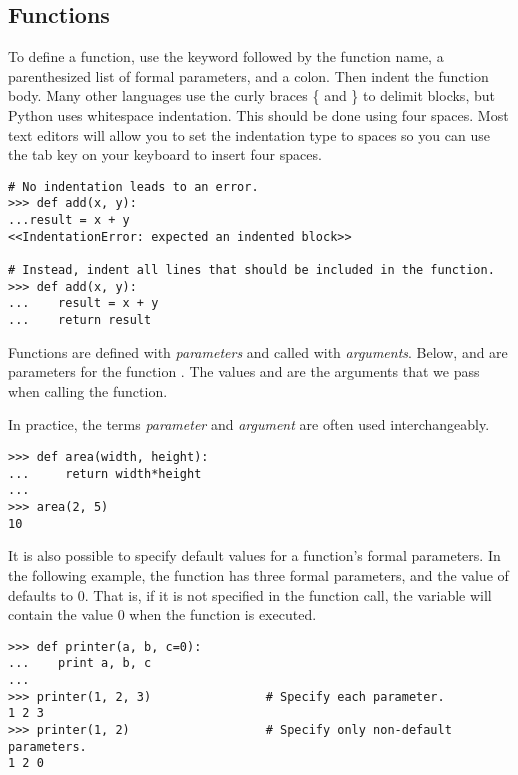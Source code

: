 \subsection*{Functions}

To define a function, use the  keyword followed by the function name, a parenthesized list of formal parameters, and a colon.
Then indent the function body.
Many other languages use the curly braces \{ and \} to delimit blocks, but Python uses whitespace indentation.
This should be done using four spaces.
Most text editors will allow you to set the indentation type to spaces so you can use the tab key on your keyboard to insert four spaces.

\begin{lstlisting}
# No indentation leads to an error.
>>> def add(x, y):
...result = x + y
<<IndentationError: expected an indented block>>

# Instead, indent all lines that should be included in the function.
>>> def add(x, y):
...    result = x + y
...    return result
\end{lstlisting}

Functions are defined with \emph{parameters} and called with \emph{arguments}.
Below,  and  are parameters for the function .
The values  and  are the arguments that we pass when calling the function.

In practice, the terms \emph{parameter} and \emph{argument} are often used interchangeably.

\begin{lstlisting}
>>> def area(width, height):
...     return width*height
...         
>>> area(2, 5)
10
\end{lstlisting}

It is also possible to specify default values for a function's formal parameters.
In the following example, the function  has three formal parameters, and the value of  defaults to 0.
That is, if it is not specified in the function call, the variable  will contain the value 0 when the function is executed.

\begin{lstlisting}
>>> def printer(a, b, c=0):
...    print a, b, c
...
>>> printer(1, 2, 3)                # Specify each parameter.
1 2 3
>>> printer(1, 2)                   # Specify only non-default parameters.
1 2 0
\end{lstlisting} %

